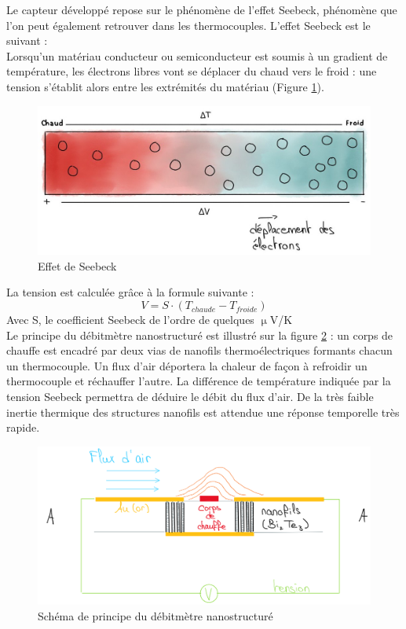 Le capteur développé repose sur le phénomène de l'effet Seebeck, phénomène que l'on peut également retrouver dans les thermocouples. L'effet 
Seebeck est le suivant :\\

Lorsqu'un matériau conducteur ou semiconducteur est soumis à un gradient de température, les électrons libres vont se déplacer du chaud vers le 
froid : une tension s'établit alors entre les extrémités du matériau (Figure \ref{fig:Seebeck}\cite{instrumentys_effet_2021}).
\begin{figure}[H]
    \centering
    \includegraphics[scale = 0.3]{images/Seebeck.jpg}
    \caption{Effet de Seebeck}
    \label{fig:Seebeck}
\end{figure}

La tension est calculée grâce à la formule suivante :
\[V = S \cdot (T_{chaude} - T_{froide})\]
Avec S, le coefficient Seebeck de l'ordre de quelques $\upmu$V/K\\

Le principe du débitmètre nanostructuré est illustré sur la figure \ref{fig:schema_coupe} : un corps de chauffe est encadré par deux vias de nanofils 
thermoélectriques formants chacun un thermocouple. Un flux d'air déportera la chaleur de façon à refroidir un thermocouple et réchauffer l'autre. La 
différence de température indiquée par la tension Seebeck permettra de déduire le débit du flux d'air. De la très faible inertie thermique des 
structures nanofils est attendue une réponse temporelle très rapide. 
\begin{figure}[H]
    \centering
    \includegraphics[scale = 0.4]{images/CapteurFUN.png}
    \caption{Schéma de principe du débitmètre nanostructuré}
    \label{fig:schema_coupe}
\end{figure}

